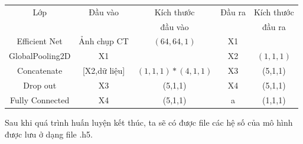 \begin{center}
\begin{tabular} {|c|c|c|c|c|}
\hline
Lớp & Đầu vào & Kích thước & Đầu ra & Kích thước \\
 & & đầu vào & &đầu ra\\
\hline
Efficient Net & Ảnh chụp CT & $(64,64,1) $ & X1 & \\
\hline
GlobalPooling2D &	X1 & & X2 & $(1,1,1)$\\
\hline
Concatenate & [X2,dữ liệu] & $(1,1,1)*(4,1,1)$ & X3 & (5,1,1)\\
\hline
Drop out & X3 & (5,1,1) & X4 & (5,1,1)\\
\hline
Fully Connected & X4 & (5,1,1) & a & (1,1,1)\\
\hline
\end{tabular}
\label{tab:train1}
\end{center}
Sau khi quá trình huấn luyện kết thúc, ta sẽ có được file các hệ số của mô hình được lưu ở dạng file .h5.
